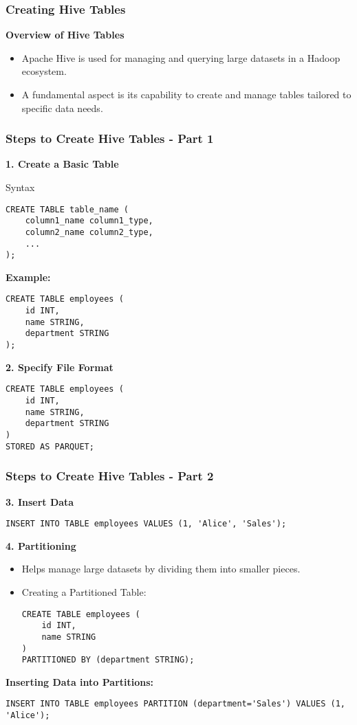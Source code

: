 \documentclass[aspectratio=169]{beamer}
\begin{document}
\begin{frame}
    \frametitle{Creating Hive Tables}
    \textbf{Overview of Hive Tables}
    \begin{itemize}
        \item Apache Hive is used for managing and querying large datasets in a Hadoop ecosystem.
        \item A fundamental aspect is its capability to create and manage tables tailored to specific data needs.
    \end{itemize}
\end{frame}

\begin{frame}[fragile]
    \frametitle{Steps to Create Hive Tables - Part 1}
    \textbf{1. Create a Basic Table}
    \begin{block}{Syntax}
        \begin{lstlisting}
CREATE TABLE table_name (
    column1_name column1_type,
    column2_name column2_type,
    ...
);
        \end{lstlisting}
    \end{block}
    
    \textbf{Example:}
    \begin{lstlisting}
CREATE TABLE employees (
    id INT,
    name STRING,
    department STRING
);
    \end{lstlisting}
    
    \textbf{2. Specify File Format}
    \begin{lstlisting}
CREATE TABLE employees (
    id INT,
    name STRING,
    department STRING
)
STORED AS PARQUET;
    \end{lstlisting}
\end{frame}

\begin{frame}[fragile]
    \frametitle{Steps to Create Hive Tables - Part 2}
    \textbf{3. Insert Data}
    \begin{lstlisting}
INSERT INTO TABLE employees VALUES (1, 'Alice', 'Sales');
    \end{lstlisting}
    
    \textbf{4. Partitioning}
    \begin{itemize}
        \item Helps manage large datasets by dividing them into smaller pieces.
        \item Creating a Partitioned Table:
        \begin{lstlisting}
CREATE TABLE employees (
    id INT,
    name STRING
)
PARTITIONED BY (department STRING);
        \end{lstlisting}
    \end{itemize}
    
    \textbf{Inserting Data into Partitions:}
    \begin{lstlisting}
INSERT INTO TABLE employees PARTITION (department='Sales') VALUES (1, 'Alice');
    \end{lstlisting}
\end{frame}
\end{document}
